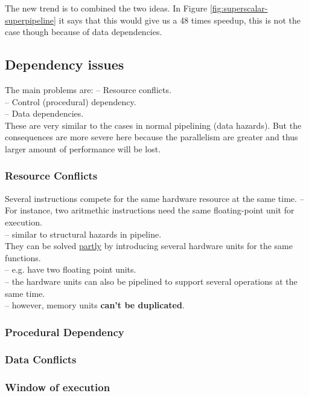 The new trend is to combined the two ideas. In Figure \ref{fig:superscalar-superpipeline} it says that this would give us a 48 times speedup, this is not the case though because of data dependencies.

\subsection{Dependency issues}
The main problems are:
-- Resource conflicts. \\
-- Control (procedural) dependency. \\
-- Data dependencies. \\

These are very similar to the cases in normal pipelining (data hazards). But the consequences are more severe here because the parallelism are greater and thus larger amount of performance will be lost. \\

\subsubsection{Resource Conflicts}
Several instructions compete for the same hardware resource at the same time.
-- For instance, two aritmethic instructions need the same floating-point unit for execution. \\
-- similar to structural hazards in pipeline. \\

They can be solved \underline{partly} by introducing several hardware units for the same functions. \\
-- e.g. have two floating point units. \\
-- the hardware units can also be pipelined to support several operations at the same time. \\
-- however, memory units \textbf{can't be duplicated}.

\subsubsection{Procedural Dependency}

\subsubsection{Data Conflicts}

\subsubsection{Window of execution}

